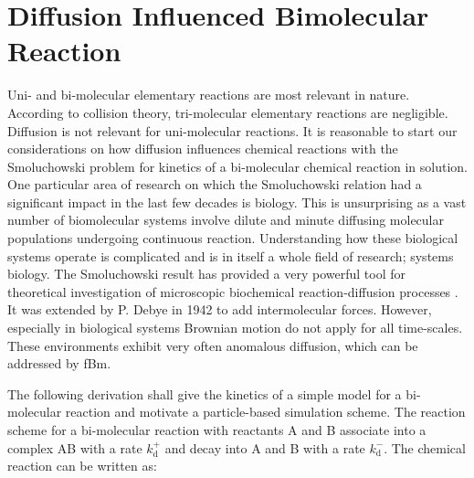 \documentclass[
  a4paper,BCOR10mm,twoside,
  headsepline,footsepline,%
  fleqn,openbib
]{scrbook}
\begin{document}
% 
% 
% 
% 

\section{Diffusion Influenced Bimolecular Reaction}\label{Erban-chapman-section}
Uni- and bi-molecular elementary reactions are most relevant in nature. According to collision theory, tri-molecular elementary reactions are negligible. Diffusion is not relevant for uni-molecular reactions. It is reasonable to start our considerations on how diffusion influences chemical reactions with the Smoluchowski problem for kinetics of a bi-molecular chemical reaction in solution. One particular area of research on which the Smoluchowski relation had a significant impact in the last few decades is biology. This is unsurprising as a vast number of biomolecular systems involve dilute and minute diffusing molecular populations undergoing continuous reaction. Understanding how these biological systems operate is complicated and is in itself a whole field of research; systems biology. The Smoluchowski result has provided a very powerful tool for theoretical investigation of microscopic biochemical reaction-diffusion processes \cite{Flegg}. It was extended by P. Debye in 1942 to add intermolecular forces. However, especially in biological systems Brownian motion do not apply for all time-scales. These environments exhibit very often anomalous diffusion, which can be addressed by fBm. 
\par
The following derivation shall give the kinetics of a simple model for a bi-molecular reaction and motivate a particle-based simulation scheme.
The reaction scheme for a bi-molecular reaction with reactants A and B associate into a complex AB with a rate $k^{+}_{\mathrm{d}}$ and decay into A and B with a rate $k^{-}_{\mathrm{d}}$. The chemical reaction can be written as:
\end{document}
